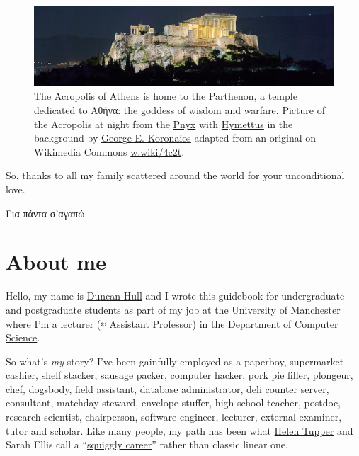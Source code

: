 \documentclass[
]{book}
\begin{document}
\begin{figure}
\includegraphics[width=1\linewidth]{images/acropolis-at-night} \caption{The \href{https://en.wikipedia.org/wiki/Acropolis_of_Athens}{Acropolis of Athens} is home to the \href{https://en.wikipedia.org/wiki/Parthenon}{Parthenon}, a temple dedicated to \href{https://en.wikipedia.org/wiki/Athena}{Αθήνα}: the goddess of wisdom and warfare. Picture of the Acropolis at night from the \href{https://en.wikipedia.org/wiki/Pnyx}{Pnyx} with \href{https://en.wikipedia.org/wiki/Hymettus}{Hymettus} in the background by \href{https://commons.wikimedia.org/wiki/User:George_E._Koronaios}{George E. Koronaios} adapted from an original on Wikimedia Commons \href{https://w.wiki/4c2t}{w.wiki/4c2t}.}\label{fig:acropolis-fig}
\end{figure}



So, thanks to all my family scattered around the world for your unconditional love.

Για πάντα σ'αγαπώ. 🙏

\hypertarget{duncan}{%
\section{About me}\label{duncan}}

Hello, my name is \href{https://personalpages.manchester.ac.uk/staff/duncan.hull/}{Duncan Hull} and I wrote this guidebook for undergraduate and postgraduate students as part of my job at the University of Manchester where I'm a lecturer (≈ \href{https://en.wikipedia.org/wiki/Assistant_professor}{Assistant Professor}) in the \href{https://www.cs.manchester.ac.uk/}{Department of Computer Science}.

So what's \emph{my} story? I've been gainfully employed as a paperboy, supermarket cashier, shelf stacker, sausage packer, computer hacker, pork pie filler, \href{https://en.wikipedia.org/wiki/Plongeur}{plongeur}, chef, dogsbody, field assistant, database administrator, deli counter server, consultant, matchday steward, envelope stuffer, high school teacher, postdoc, research scientist, chairperson, software engineer, lecturer, external examiner, tutor and scholar. Like many people, my path has been what \href{https://twitter.com/HelenTupper}{Helen Tupper} and Sarah Ellis call a ``\href{https://www.amazingif.com/books/}{squiggly career}'' rather than classic linear one. \citep{squigglybook, squigglytalk}
\end{document}
